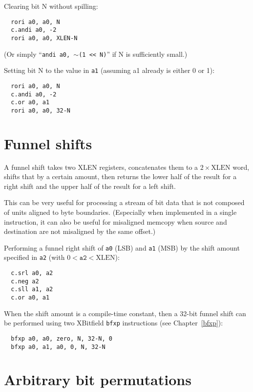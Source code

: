Clearing bit N without spilling:

\begin{verbatim}
  rori a0, a0, N
  c.andi a0, -2
  rori a0, a0, XLEN-N
\end{verbatim}

(Or simply ``{\tt andi a0, $\sim$(1 << N)}'' if N is sufficiently small.)

Setting bit N to the value in {\tt a1} (assuming a1 already is either 0 or 1):

\begin{verbatim}
  rori a0, a0, N
  c.andi a0, -2
  c.or a0, a1
  rori a0, a0, 32-N
\end{verbatim}

\section{Funnel shifts}
\label{funnel}

A funnel shift takes two XLEN registers, concatenates them to a $2 \times \textrm{XLEN}$ word,
shifts that by a certain amount, then returns the lower half of the result
for a right shift and the upper half of the result for a left shift.

This can be very useful for processing a stream of bit data that is not
composed of units aligned to byte boundaries. (Especially when implemented
in a single instruction, it can also be useful for misaligned memcopy when
source and destination are not misaligned by the same offset.)

Performing a funnel right shift of {\tt a0} (LSB) and {\tt a1} (MSB) by the
shift amount specified in {\tt a2} (with $0 < \texttt{a2} < \textrm{XLEN}$):

\begin{verbatim}
  c.srl a0, a2
  c.neg a2
  c.sll a1, a2
  c.or a0, a1
\end{verbatim}

When the shift amount is a compile-time constant, then a 32-bit funnel shift can be
performed using two XBitfield {\tt bfxp} instructions (see Chapter~\ref{bfxp}):

\begin{verbatim}
  bfxp a0, a0, zero, N, 32-N, 0
  bfxp a0, a1, a0, 0, N, 32-N
\end{verbatim}

\section{Arbitrary bit permutations}

